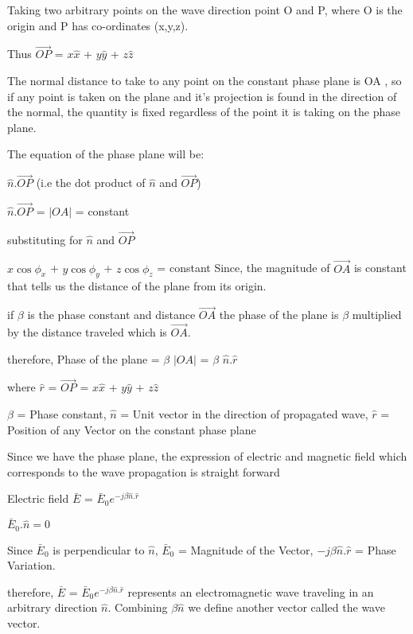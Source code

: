 Taking two arbitrary points on the wave direction point O and P, where O is the origin and P has co-ordinates (x,y,z).

Thus $\vec{OP}$ = $x\hat{x}$ + $y\hat{y}$ + $z\hat{z}$

The normal distance to take to any point on the constant phase plane is OA , so if any point is taken on the plane and it's projection is found in the direction of the normal, the quantity is fixed regardless of the point it is taking on the phase plane.

The equation of the phase plane will be:

\begin{center}
$\hat{n}$.$\vec{OP}$ (i.e the dot product of $\hat{n}$ and $\vec{OP}$)

$\hat{n}$.$\vec{OP}$ = $\left|OA \right|$  = constant

substituting for $\hat{n}$ and $\vec{OP}$
\end{center}
$x\cos\phi_{x}$ + $y\cos\phi_{y}$ + $z\cos\phi_{z}$ = constant
Since, the magnitude of $\vec{OA}$ is constant that tells us the distance of the plane from its origin.

if $\beta$ is the phase constant and distance $\vec{OA}$ the phase of the plane is $\beta$ multiplied by the distance traveled which is $\vec{OA}$.

\begin{center}
therefore, Phase of the plane = $\beta$ $\left|OA \right|$ = $\beta$ $\hat{n}.\hat{r}$

where $\hat{r}$ = $\vec{OP}$ = $x\hat{x}$ + $y\hat{y}$ + $z\hat{z}$

\end{center}
$\beta$ = Phase constant,
$\hat{n}$ = Unit vector in the direction of propagated wave,
$\hat{r}$ = Position of any Vector on the constant phase plane

Since we have the phase plane, the expression of electric and magnetic field which corresponds to the wave propagation is straight forward
\begin{center}

Electric field $\bar{E}$ = $\bar{E}_{0}e^{-j\beta \hat{n}.\hat{r}}$

\end{center}
$\bar{E}_{0}.\hat{n} = 0$

Since $\bar{E}_{0}$ is perpendicular to $\hat{n}$,
$\bar{E}_{0}$ = Magnitude of the Vector,
$-j\beta \hat{n}.\hat{r}$ = Phase Variation.

therefore, $\bar{E}$ = $\bar{E}_{0}e^{-j\beta \hat{n}.\hat{r}}$ represents an electromagnetic wave traveling in an arbitrary direction $\hat{n}$.
Combining $\beta\hat{n}$ we define another vector called the wave vector.

